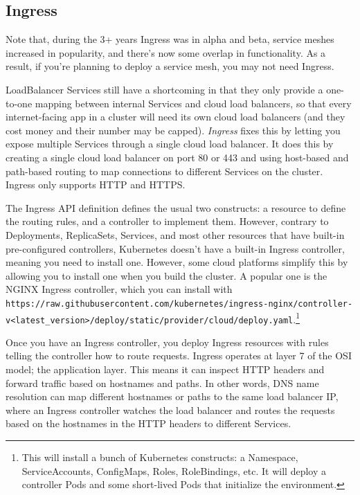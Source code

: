 \documentclass[table, xcdraw]{article}%
\begin{document}
\subsection{Ingress}

Note that, during the 3+ years Ingress was in alpha and beta, service meshes increased in popularity, and there’s now some overlap in functionality. As a result, if you’re planning to deploy a service mesh, you may not need Ingress.

LoadBalancer Services still have a shortcoming in that they only provide a one-to-one mapping between internal Services and cloud load balancers, so that every internet-facing app in a cluster will need its own cloud load balancers (and they cost money and their number may be capped). \emph{Ingress} fixes this by letting you expose multiple Services through a single cloud load balancer. It does this by creating a single cloud load balancer on port 80 or 443 and using host-based and path-based routing to map connections to different Services on the cluster. Ingress only supports HTTP and HTTPS.

The Ingress API definition defines the usual two constructs: a resource to define the routing rules, and a controller to implement them. However, contrary to Deployments, ReplicaSets, Services, and most other resources that have built-in pre-configured controllers, Kubernetes doesn’t have a built-in Ingress controller, meaning you need to install one. However, some cloud platforms simplify this by allowing you to install one when you build the cluster. A popular one is the NGINX Ingress controller, which you can install with \texttt{https://raw.githubusercontent.com/kubernetes/ingress-nginx/controller-v<latest_version>/deploy/static/provider/cloud/deploy.yaml}.\footnote{This will install a bunch of Kubernetes constructs: a Namespace, ServiceAccounts, ConfigMaps, Roles, RoleBindings, etc. It will deploy a controller Pods and some short-lived Pods that initialize the environment.}

Once you have an Ingress controller, you deploy Ingress resources with rules telling the controller how to route requests. Ingress operates at layer 7 of the OSI model; the application layer. This means it can inspect HTTP headers and forward traffic based on hostnames and paths. In other words, DNS name resolution can map different hostnames or paths to the same load balancer IP, where an Ingress controller watches the load balancer and routes the requests based on the hostnames in the HTTP headers to different Services.
\end{document}
